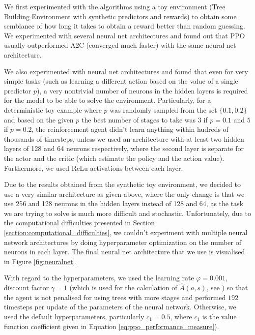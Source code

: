 We first experimented with the algorithms using a toy environment (Tree Building Environment with synthetic predictors and rewards) to obtain some semblance of how long it takes to obtain a reward better than random guessing. We experimented with several neural net architectures and found out that PPO usually outperformed A2C (converged much faster) with the same neural net architecture. 

We also experimented with neural net architectures and found that even for very simple tasks (such as learning a different action based on the value of a single predictor $p$), a very nontrivial number of neurons in the hidden layers is required for the model to be able to solve the environment. Particularly, for a deterministic toy example where $p$ was randomly sampled from the set $\{0.1, 0.2\}$ and based on the given $p$ the best number of stages to take was $3$ if $p=0.1$ and $5$ if $p=0.2$, the reinforcement agent didn't learn anything within hudreds of thousands of timesteps, unless we used an architecture with at least two hidden layers of 128 and 64 neurons respectively, where the second layer is separate for the actor and the critic (which estimate the policy and the action value). Furthermore, we used ReLu activations between each layer. 

Due to the results obtained from the synthetic toy environment, we decided to use a very similar architecture as given above, where the only change is that we use 256 and 128 neurons in the hidden layers instead of 128 and 64, as the task we are trying to solve is much more difficult and stochastic. Unfortunately, due to the computational difficulties presented in Section \ref{section:computational_difficulties}, we couldn't experiment with multiple neural network architectures by doing hyperparameter optimization on the number of neurons in each layer. The final neural net architecture that we use is visualised in Figure \ref{fig:neuralnet}. 


With regard to the hyperparameters, we used the learning rate $\varphi=0.001$, discount factor $\gamma=1$ (which is used for the calculation of $\widehat{A}(a,s)$, see \cite[Section 5]{proximal_policy_optimization}) so that the agent is not penalised for using trees with more stages and performed $192$ timesteps per update of the parameters of the neural network. Otherwise, we used the default hyperparameters, particularly $c_1=0.5$, where $c_1$ is the value function coefficient given in Equation \ref{eq:ppo_performance_measure}).

